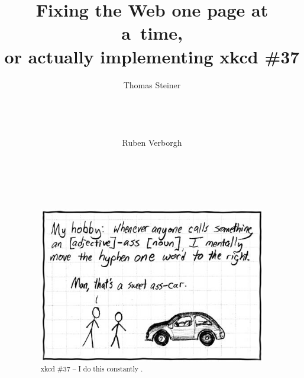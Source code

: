 \documentclass{acm_proc_article-sp}
\begin{document}
\title{Fixing the Web one page at a~time,\\ or actually implementing xkcd \#37}

\author{
\alignauthor
Thomas Steiner\\
	\\
	\\
	\\
	\\
\alignauthor
Ruben Verborgh\\
	\\
	\\
	\\
	\\
}
\maketitle

\begin{abstract}
\begin{figure}[h!]
\centering
\includegraphics[width=\columnwidth]{hyphen.jpg}
\caption{xkcd \#37 -- I do this constantly \cite{xkcd37}.}
\label{fig:xkcd37}
\end{figure}
\end{abstract}

\end{document}
